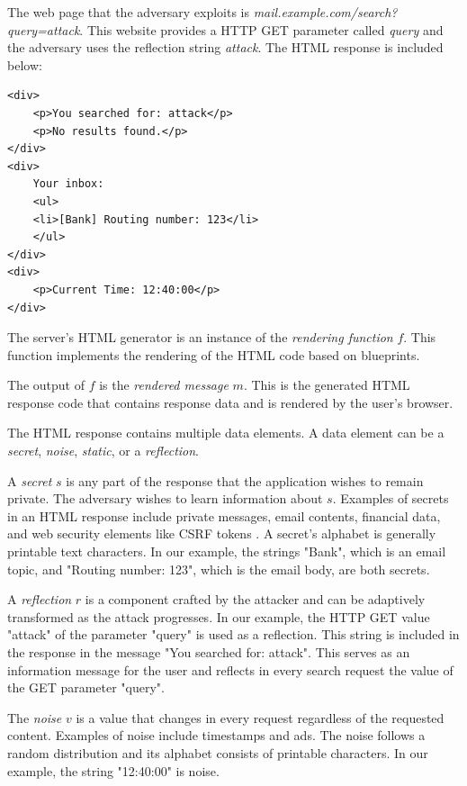 The web page that the adversary exploits is
\textit{mail.example.com/search?query=attack}. This website provides a HTTP GET
parameter called \textit{query} and the adversary uses the reflection string
\textit{attack}. The HTML response is included below:

\begin{lstlisting}[basicstyle=\small\ttfamily]
<div>
    <p>You searched for: attack</p>
    <p>No results found.</p>
</div>
<div>
    Your inbox:
    <ul>
    <li>[Bank] Routing number: 123</li>
    </ul>
</div>
<div>
    <p>Current Time: 12:40:00</p>
</div>
\end{lstlisting}

The server's HTML generator is an instance of the \textit{rendering function}
$f$. This function implements the rendering of the HTML code based on
blueprints.

The output of $f$ is the \textit{rendered message} $m$. This is the generated
HTML response code that contains response data and is rendered by the user's
browser.

The HTML response contains multiple data elements. A data element can be a
\textit{secret}, \textit{noise}, \textit{static}, or a \textit{reflection}.

A \textit{secret} $s$ is any part of the response that the application wishes to
remain private. The adversary wishes to learn information about $s$. Examples of
secrets in an HTML response include private messages, email contents, financial
data, and web security elements like CSRF tokens \cite{de2011automatic}. A
secret's alphabet is generally printable text characters. In our example, the
strings "Bank", which is an email topic, and "Routing number: 123", which is the
email body, are both secrets.

A \textit{reflection} $r$ is a component crafted by the attacker and can be
adaptively transformed as the attack progresses. In our example, the HTTP GET
value "attack" of the parameter "query" is used as a reflection. This string is
included in the response in the message "You searched for: attack". This serves
as an information message for the user and reflects in every search request the
value of the GET parameter "query".

The \textit{noise} $v$ is a value that changes in every request regardless of
the requested content. Examples of noise include timestamps and ads. The noise
follows a random distribution and its alphabet consists of printable characters.
In our example, the string "12:40:00" is noise.

